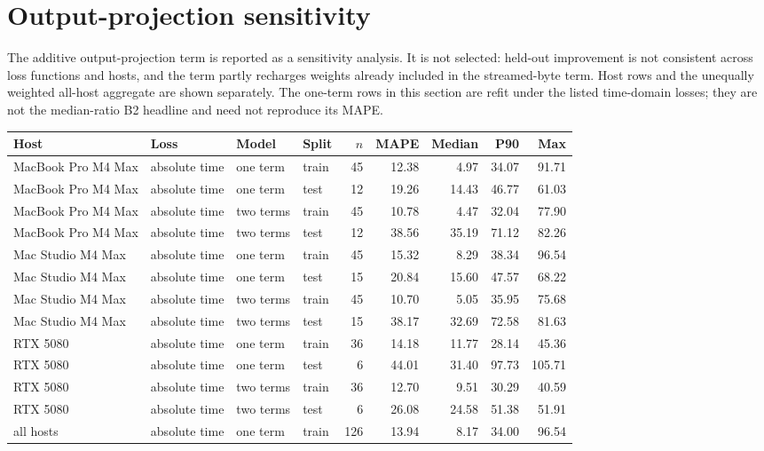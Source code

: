 \documentclass[10pt]{article}
\begin{document}
\section{Output-projection sensitivity}
The additive output-projection term is reported as a sensitivity analysis. It is not selected: held-out improvement is not consistent across loss functions and hosts, and the term partly recharges weights already included in the streamed-byte term. Host rows and the unequally weighted all-host aggregate are shown separately. The one-term rows in this section are refit under the listed time-domain losses; they are not the median-ratio B2 headline and need not reproduce its MAPE.
\begin{center}
\small
\begin{tabular}{llllrrrrr}
\toprule
Host & Loss & Model & Split & $n$ & MAPE & Median & P90 & Max\\
\midrule
MacBook Pro M4 Max & absolute time & one term & train & 45 & 12.38 & 4.97 & 34.07 & 91.71 \\
MacBook Pro M4 Max & absolute time & one term & test & 12 & 19.26 & 14.43 & 46.77 & 61.03 \\
MacBook Pro M4 Max & absolute time & two terms & train & 45 & 10.78 & 4.47 & 32.04 & 77.90 \\
MacBook Pro M4 Max & absolute time & two terms & test & 12 & 38.56 & 35.19 & 71.12 & 82.26 \\
Mac Studio M4 Max & absolute time & one term & train & 45 & 15.32 & 8.29 & 38.34 & 96.54 \\
Mac Studio M4 Max & absolute time & one term & test & 15 & 20.84 & 15.60 & 47.57 & 68.22 \\
Mac Studio M4 Max & absolute time & two terms & train & 45 & 10.70 & 5.05 & 35.95 & 75.68 \\
Mac Studio M4 Max & absolute time & two terms & test & 15 & 38.17 & 32.69 & 72.58 & 81.63 \\
RTX 5080 & absolute time & one term & train & 36 & 14.18 & 11.77 & 28.14 & 45.36 \\
RTX 5080 & absolute time & one term & test & 6 & 44.01 & 31.40 & 97.73 & 105.71 \\
RTX 5080 & absolute time & two terms & train & 36 & 12.70 & 9.51 & 30.29 & 40.59 \\
RTX 5080 & absolute time & two terms & test & 6 & 26.08 & 24.58 & 51.38 & 51.91 \\
all hosts & absolute time & one term & train & 126 & 13.94 & 8.17 & 34.00 & 96.54 \\

\end{tabular}
\end{center}
\end{document}

